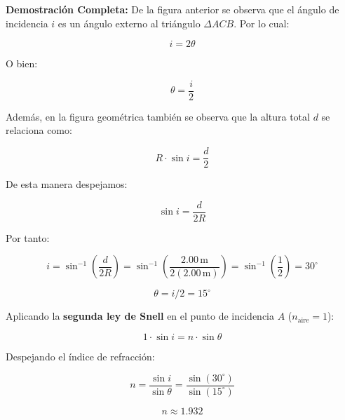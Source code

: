 \documentclass[12pt, a4paper]{article}
\theoremstyle{definition}
\begin{document}
\textbf{Demostración Completa:} De la figura anterior se observa que el ángulo de incidencia
\(i\) es un ángulo externo al triángulo \(\Delta ACB\). Por lo cual:

\begin{equation}
  i = 2\theta
  \label{eq:i_2theta}
\end{equation}

O bien:

\begin{equation}
  \theta = \frac{i}{2}
  \label{eq:theta_medio}
\end{equation}

Además, en la figura geométrica también se observa que la altura total \(d\) se relaciona como:

\begin{equation}
  R\cdot\sin i = \frac{d}{2}
  \label{eq:R_seni}
\end{equation}

De esta manera despejamos:

\begin{equation}
  \sin i = \frac{d}{2R}
  \label{eq:seni}
\end{equation}

Por tanto:

\begin{equation}
  i = \sin^{-1}\!\left(\frac{d}{2R}\right) = \sin^{-1}\!\left(\frac{2.00\,\text{m}}{2(2.00\,\text{m})}\right)
    = \sin^{-1}\!\left(\frac{1}{2}\right) = 30^{\circ}
  \label{eq:calculo_i}
\end{equation}

\begin{equation}
  \theta = i/2 = 15^{\circ}
  \label{eq:calculo_theta}
\end{equation}

Aplicando la \textbf{segunda ley de Snell} en el punto de incidencia \(A\) (\(n_{\text{aire}} = 1\)):

\begin{equation}
  1\cdot\sin i = n\cdot\sin\theta
  \label{eq:snell_cilindro}
\end{equation}

Despejando el índice de refracción:

\begin{equation}
  n = \frac{\sin i}{\sin\theta} = \frac{\sin(30^{\circ})}{\sin(15^{\circ})}
  \label{eq:n_cilindro}
\end{equation}

\begin{equation}
  \boxed{n \approx 1.932}
  \label{eq:n_valor}
\end{equation}
\end{document}

